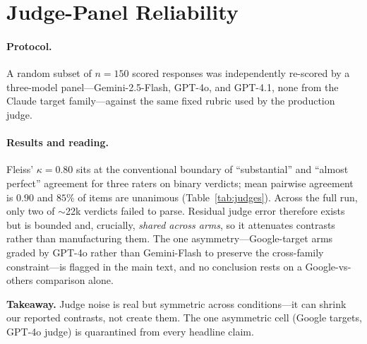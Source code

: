 \section{Judge-Panel Reliability}
\label{app:judge}

\paragraph{Protocol.}
A random subset of $n{=}150$ scored responses was independently re-scored by a three-model panel---Gemini-2.5-Flash, GPT-4o, and GPT-4.1, none from the Claude target family---against the same fixed rubric used by the production judge.

\paragraph{Results and reading.}
Fleiss' $\kappa{=}0.80$ sits at the conventional boundary of ``substantial'' and ``almost perfect'' agreement for three raters on binary verdicts; mean pairwise agreement is $0.90$ and $85\%$ of items are unanimous (Table~\ref{tab:judges}). Across the full run, only two of $\sim$22k verdicts failed to parse. Residual judge error therefore exists but is bounded and, crucially, \emph{shared across arms}, so it attenuates contrasts rather than manufacturing them. The one asymmetry---Google-target arms graded by GPT-4o rather than Gemini-Flash to preserve the cross-family constraint---is flagged in the main text, and no conclusion rests on a Google-vs-others comparison alone.

\begin{keybox}
\small\textbf{Takeaway.} Judge noise is real but symmetric across conditions---it can shrink our reported contrasts, not create them. The one asymmetric cell (Google targets, GPT-4o judge) is quarantined from every headline claim.
\end{keybox}

